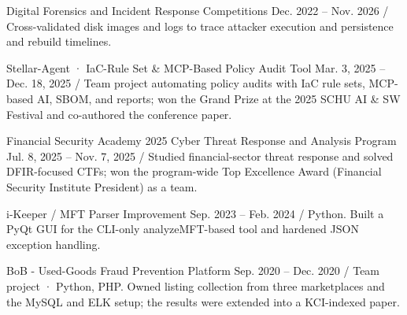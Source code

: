     \resumeProject
      {Digital Forensics and Incident Response Competitions}
      {Dec. 2022 -- Nov. 2026 / Cross-validated disk images and logs to trace attacker execution and persistence and rebuild timelines.}
      \resumeItemListStart
      \resumeItemListEnd

    \resumeProject
      {Stellar-Agent · IaC-Rule Set \& MCP-Based Policy Audit Tool}
      {Mar. 3, 2025 -- Dec. 18, 2025 / Team project automating policy audits with IaC rule sets, MCP-based AI, SBOM, and reports; won the Grand Prize at the 2025 SCHU AI \& SW Festival and co-authored the conference paper.}
      \resumeItemListStart
      \resumeItemListEnd

    \resumeProject
      {Financial Security Academy 2025 Cyber Threat Response and Analysis Program}
      {Jul. 8, 2025 -- Nov. 7, 2025 / Studied financial-sector threat response and solved DFIR-focused CTFs; won the program-wide Top Excellence Award (Financial Security Institute President) as a team.}
      \resumeItemListStart
      \resumeItemListEnd

    \resumeProject
      {i-Keeper / MFT Parser Improvement}
      {Sep. 2023 -- Feb. 2024 / Python. Built a PyQt GUI for the CLI-only analyzeMFT-based tool and hardened JSON exception handling.}

    \resumeProject
      {BoB - Used-Goods Fraud Prevention Platform}
      {Sep. 2020 -- Dec. 2020 / Team project · Python, PHP. Owned listing collection from three marketplaces and the MySQL and ELK setup; the results were extended into a KCI-indexed paper.}
  \resumeSubHeadingListEnd

